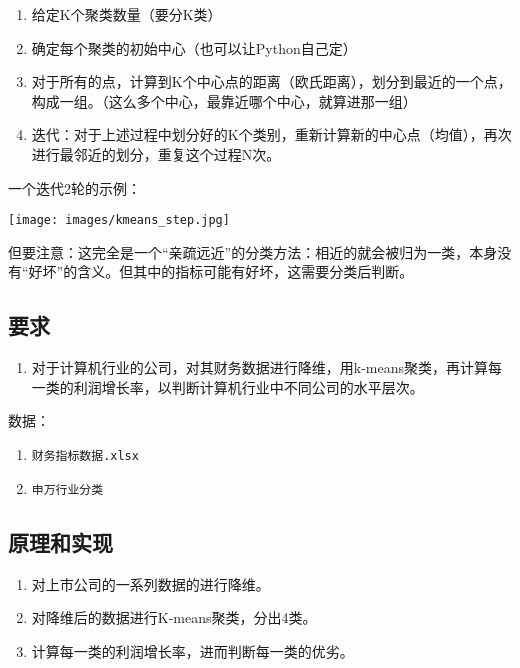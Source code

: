 \documentclass[
  letterpaper,
  DIV=11,
  numbers=noendperiod]{scrreprt}
\providecommand{\tightlist}{%
  \setlength{\itemsep}{0pt}\setlength{\parskip}{0pt}}\usepackage{longtable,booktabs,array}
\begin{document}
\begin{enumerate}
\def\labelenumi{\arabic{enumi}.}
\tightlist
\item
  给定K个聚类数量（要分K类）
\item
  确定每个聚类的初始中心（也可以让Python自己定）
\item
  对于所有的点，计算到K个中心点的距离（欧氏距离），划分到最近的一个点，构成一组。（这么多个中心，最靠近哪个中心，就算进那一组）
\item
  迭代：对于上述过程中划分好的K个类别，重新计算新的中心点（均值），再次进行最邻近的划分，重复这个过程N次。
\end{enumerate}

一个迭代2轮的示例：

\texttt{[image: images/kmeans\_step.jpg]}

但要注意：这完全是一个``亲疏远近''的分类方法：相近的就会被归为一类，本身没有``好坏''的含义。但其中的指标可能有好坏，这需要分类后判断。

\hypertarget{ux8981ux6c42-5}{%
\subsection{要求}\label{ux8981ux6c42-5}}

\begin{enumerate}
\def\labelenumi{\arabic{enumi}.}
\tightlist
\item
  对于计算机行业的公司，对其财务数据进行降维，用k-means聚类，再计算每一类的利润增长率，以判断计算机行业中不同公司的水平层次。
\end{enumerate}

数据：

\begin{enumerate}
\def\labelenumi{\arabic{enumi}.}
\tightlist
\item
  \texttt{财务指标数据.xlsx}
\item
  \texttt{申万行业分类}
\end{enumerate}

\hypertarget{ux539fux7406ux548cux5b9eux73b0-2}{%
\subsection{原理和实现}\label{ux539fux7406ux548cux5b9eux73b0-2}}

\begin{enumerate}
\def\labelenumi{\arabic{enumi}.}
\tightlist
\item
  对上市公司的一系列数据的进行降维。
\item
  对降维后的数据进行K-means聚类，分出4类。
\item
  计算每一类的利润增长率，进而判断每一类的优劣。
\end{enumerate}
\end{document}
